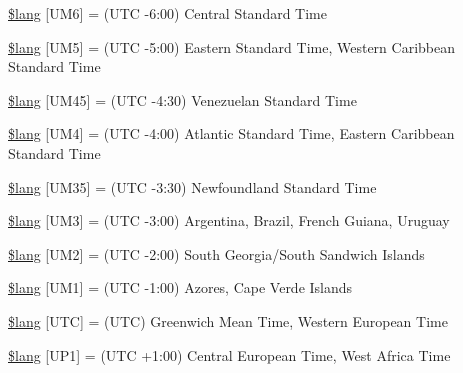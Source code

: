 \begin{DoxyCompactItemize}
\mbox{\hyperlink{date__lang_8php_a50ab6de250eb45dd4071f052cf0ae1a6}{\$lang}} \mbox{[}\textquotesingle{}U\+M6\textquotesingle{}\mbox{]} = \textquotesingle{}(U\+TC -\/6\+:00) Central Standard Time\textquotesingle{}
\item 
\mbox{\hyperlink{date__lang_8php_acbdc94a553563f39fad3f2bc2dc85a77}{\$lang}} \mbox{[}\textquotesingle{}U\+M5\textquotesingle{}\mbox{]} = \textquotesingle{}(U\+TC -\/5\+:00) Eastern Standard Time, Western Caribbean Standard Time\textquotesingle{}
\item 
\mbox{\hyperlink{date__lang_8php_afa94a50b79072afd4e9ffcc5d44c308b}{\$lang}} \mbox{[}\textquotesingle{}U\+M45\textquotesingle{}\mbox{]} = \textquotesingle{}(U\+TC -\/4\+:30) Venezuelan Standard Time\textquotesingle{}
\item 
\mbox{\hyperlink{date__lang_8php_a40c0c7104b23705928856cce36ad3d3e}{\$lang}} \mbox{[}\textquotesingle{}U\+M4\textquotesingle{}\mbox{]} = \textquotesingle{}(U\+TC -\/4\+:00) Atlantic Standard Time, Eastern Caribbean Standard Time\textquotesingle{}
\item 
\mbox{\hyperlink{date__lang_8php_a360e08a692bcd469432096fdc362a9f9}{\$lang}} \mbox{[}\textquotesingle{}U\+M35\textquotesingle{}\mbox{]} = \textquotesingle{}(U\+TC -\/3\+:30) Newfoundland Standard Time\textquotesingle{}
\item 
\mbox{\hyperlink{date__lang_8php_af645b58e0860667b9cbc94b119b70405}{\$lang}} \mbox{[}\textquotesingle{}U\+M3\textquotesingle{}\mbox{]} = \textquotesingle{}(U\+TC -\/3\+:00) Argentina, Brazil, French Guiana, Uruguay\textquotesingle{}
\item 
\mbox{\hyperlink{date__lang_8php_ad911b59b076919d78c7c84a4b1223802}{\$lang}} \mbox{[}\textquotesingle{}U\+M2\textquotesingle{}\mbox{]} = \textquotesingle{}(U\+TC -\/2\+:00) South Georgia/South Sandwich Islands\textquotesingle{}
\item 
\mbox{\hyperlink{date__lang_8php_aa24fd948facfe7a9a6c33cb242420b27}{\$lang}} \mbox{[}\textquotesingle{}U\+M1\textquotesingle{}\mbox{]} = \textquotesingle{}(U\+TC -\/1\+:00) Azores, Cape Verde Islands\textquotesingle{}
\item 
\mbox{\hyperlink{date__lang_8php_a4f054f87e50e828424dbfcaa33c5a8df}{\$lang}} \mbox{[}\textquotesingle{}U\+TC\textquotesingle{}\mbox{]} = \textquotesingle{}(U\+TC) Greenwich Mean Time, Western European Time\textquotesingle{}
\item 
\mbox{\hyperlink{date__lang_8php_affecc464623db3bf060bc5d1d8f3429d}{\$lang}} \mbox{[}\textquotesingle{}U\+P1\textquotesingle{}\mbox{]} = \textquotesingle{}(U\+TC +1\+:00) Central European Time, West Africa Time\textquotesingle{}

\end{DoxyCompactItemize}

